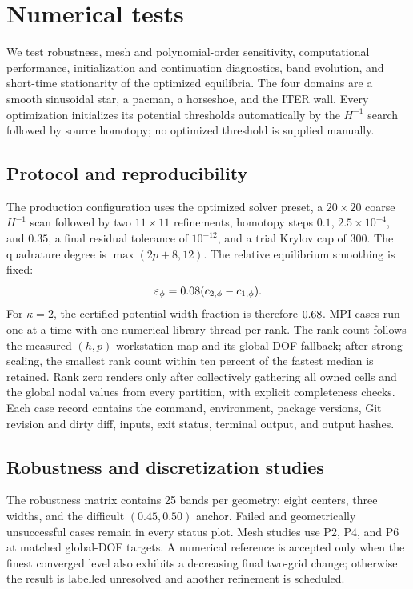 \section{Numerical tests}\label{sec:numerical-tests}


We test robustness, mesh and polynomial-order sensitivity, computational
performance, initialization and continuation diagnostics, band evolution, and
short-time stationarity of the optimized equilibria.  The four domains are a
smooth sinusoidal star, a pacman, a horseshoe, and the ITER wall.  Every
optimization initializes its potential thresholds automatically by the
$H^{-1}$ search followed by source homotopy; no optimized threshold is supplied
manually.

\subsection{Protocol and reproducibility}
The production configuration uses the optimized solver preset, a $20\times20$
coarse $H^{-1}$ scan followed by two $11\times11$ refinements, homotopy steps
$0.1$, $2.5\times10^{-4}$, and $0.35$, a final residual tolerance of
$10^{-12}$, and a trial Krylov cap of 300.  The quadrature degree is
$\max(2p+8,12)$.  The relative equilibrium smoothing is fixed:
\[
  \varepsilon_\phi=0.08
  (c_{2,\phi}-c_{1,\phi}).
\]
For $\kappa=2$, the certified potential-width fraction is therefore
$0.68$.  MPI cases run one at a time with one
numerical-library thread per rank.  The rank count follows the measured
$(h,p)$ workstation map and its global-DOF fallback; after strong scaling, the
smallest rank count within ten percent of the fastest median is retained.
Rank zero renders only after collectively gathering all owned cells and the
global nodal values from every partition, with explicit completeness checks.
Each case record contains the command, environment, package versions, Git
revision and dirty diff, inputs, exit status, terminal output, and output
hashes.

\subsection{Robustness and discretization studies}
The robustness matrix contains 25 bands per geometry: eight centers, three
widths, and the difficult $(0.45,0.50)$ anchor.  Failed and geometrically
unsuccessful cases remain in every status plot.  Mesh studies use P2, P4, and
P6 at matched global-DOF targets.  A numerical reference is accepted only when
the finest converged level also exhibits a decreasing final two-grid change;
otherwise the result is labelled unresolved and another refinement is
scheduled.

